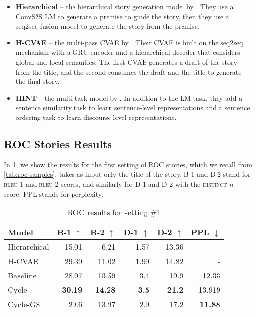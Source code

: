 \begin{itemize}
\item \textbf{Hierarchical} -- the hierarchical story generation model by \citep{fan2018hierarchical}. They use a ConvS2S LM to generate a premise to guide the story, then they use a seq2seq fusion model to generate the story from the premise.

\item \textbf{H-CVAE} -- the multi-pass CVAE by \citep{yu2020draft}. Their CVAE is built on the seq2seq mechanism with a GRU encoder and a hierarchical decoder that considers global and local semantics. The first CVAE generates a draft of the story from the title, and the second consumes the draft and the title to generate the final story.

\item \textbf{HINT} -- the multi-task model by \citep{guan2021long}. In addition to the LM task, they add a sentence similarity task to learn sentence-level representations and a sentence ordering task to learn discourse-level representations.
\end{itemize}

\subsection{ROC Stories Results}
\label{sec:roc_results}

In \cref{table:roc_1_results}, we show the results for the first setting of ROC stories, which we recall from \cref{tab:roc-samples}, takes as input only the title of the story. B-1 and B-2 stand for \textsc{bleu}-1 and \textsc{bleu}-2 scores, and similarly for D-1 and D-2 with the \textsc{distinct}-$n$ score. PPL stands for perplexity.

\begin{table}[ht]
\centering
\begin{tabular}{l|rr|rr|r}
Model & B-1 $\uparrow$ & B-2 $\uparrow$ & D-1 $\uparrow$ & D-2 $\uparrow$ & PPL $\downarrow$  \\ \hline
Hierarchical & 15.01 & 6.21 & 1.57 & 13.36 & - \\
H-CVAE & 29.39 & 11.02 & 1.99 & 14.82 & - \\ \hline
Baseline & 28.97 & 13.59 & 3.4 & 19.9  & 12.33 \\
Cycle & \textbf{30.19} & \textbf{14.28} & \textbf{3.5} & \textbf{21.2} & 13.919 \\
Cycle-GS & 29.6 & 13.97 & 2.9 & 17.2 & \textbf{11.88}
\end{tabular}
\caption{ROC results for setting \#1}
\label{table:roc_1_results}
\end{table}

